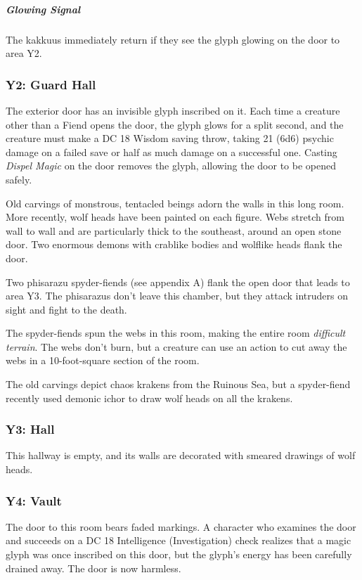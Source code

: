 \documentclass[10pt,a4paper,twoside,bg=print,twocolumn,openany,nodeprecatedcode]{dndbook}
\begin{document}
\subparagraph{Glowing Signal}
The kakkuus immediately return if they see the glyph glowing on the door to area Y2.

\subsubsection{Y2: Guard Hall}
The exterior door has an invisible glyph inscribed on it. Each time a creature other than a Fiend opens the door, the glyph glows for a split second, and the creature must make a DC 18 Wisdom saving throw, taking 21 (6d6) psychic damage on a failed save or half as much damage on a successful one. Casting \textit{Dispel Magic} on the door removes the glyph, allowing the door to be opened safely.

\begin{DndReadAloud}{}
Old carvings of monstrous, tentacled beings adorn the walls in this long room. More recently, wolf heads have been painted on each figure. Webs stretch from wall to wall and are particularly thick to the southeast, around an open stone door. Two enormous demons with crablike bodies and wolflike heads flank the door.

\end{DndReadAloud}

Two phisarazu spyder-fiends (see appendix A) flank the open door that leads to area Y3. The phisarazus don't leave this chamber, but they attack intruders on sight and fight to the death.

The spyder-fiends spun the webs in this room, making the entire room \textit{difficult terrain}. The webs don't burn, but a creature can use an action to cut away the webs in a 10-foot-square section of the room.

The old carvings depict chaos krakens from the Ruinous Sea, but a spyder-fiend recently used demonic ichor to draw wolf heads on all the krakens.

\subsubsection{Y3: Hall}
\begin{DndReadAloud}{}
This hallway is empty, and its walls are decorated with smeared drawings of wolf heads.

\end{DndReadAloud}

\subsubsection{Y4: Vault}
The door to this room bears faded markings. A character who examines the door and succeeds on a DC 18 Intelligence (Investigation) check realizes that a magic glyph was once inscribed on this door, but the glyph's energy has been carefully drained away. The door is now harmless.
\end{document}
